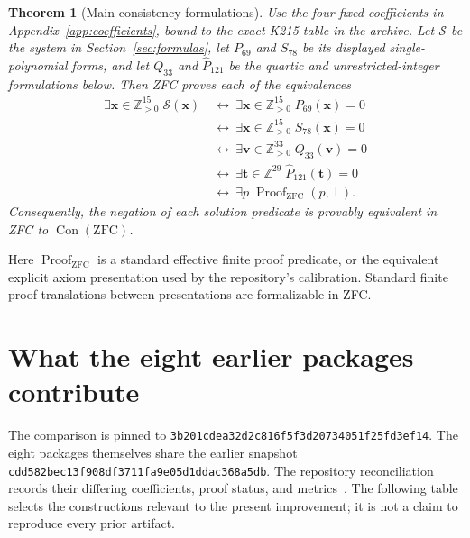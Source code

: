 \documentclass[11pt,a4paper]{article}
\newtheorem{theorem}{Theorem}[section]
\theoremstyle{remark}\newtheorem{remark}[theorem]{Remark}
\newcommand{\Z}{\mathbb Z}
\newcommand{\Pos}{\mathbb Z_{>0}}
\newcommand{\Con}{\operatorname{Con}}
\newcommand{\src}[1]{\nolinkurl{#1}}
\newcommand{\pin}{\texttt{3b201cdea32d2c816f5f3d20734051f25fd3ef14}}
\begin{document}
\begin{theorem}[Main consistency formulations]\label{thm:main}
Use the four fixed coefficients in Appendix~\ref{app:coefficients},
bound to the exact K215 table in the archive. Let $\mathcal S$ be the
system in Section~\ref{sec:formulas}, let $P_{69}$ and $S_{78}$ be its
displayed single-polynomial forms, and let $Q_{33}$ and $\widehat P_{121}$
be the quartic and unrestricted-integer formulations below. Then ZFC
proves each of the equivalences
\begin{align*}
 \exists\mathbf x\in\Pos^{15}\;\mathcal S(\mathbf x)
 &\ \longleftrightarrow\ \exists\mathbf x\in\Pos^{15}\;P_{69}(\mathbf x)=0\\
 &\ \longleftrightarrow\ \exists\mathbf x\in\Pos^{15}\;S_{78}(\mathbf x)=0\\
 &\ \longleftrightarrow\ \exists\mathbf v\in\Pos^{33}\;Q_{33}(\mathbf v)=0\\
 &\ \longleftrightarrow\ \exists\mathbf t\in\Z^{29}\;\widehat P_{121}(\mathbf t)=0\\
 &\ \longleftrightarrow\ \exists p\;\operatorname{Proof}_{\mathrm{ZFC}}(p,\bot).
\end{align*}
Consequently, the negation of each solution predicate is provably
equivalent in ZFC to $\Con(\mathrm{ZFC})$.
\end{theorem}
Here $\operatorname{Proof}_{\mathrm{ZFC}}$ is a standard effective
finite proof predicate, or the equivalent explicit axiom presentation
used by the repository's calibration. Standard finite proof
translations between presentations are formalizable in ZFC.

\section{What the eight earlier packages contribute}
The comparison is pinned to \pin. The eight packages themselves share
the earlier snapshot \src{cdd582bec13f908df3711fa9e05d1ddac368a5db}.
The repository reconciliation records their differing coefficients,
proof status, and metrics~\cite{reconciliation}. The following table
selects the constructions relevant to the present improvement; it is
not a claim to reproduce every prior artifact.
\end{document}
